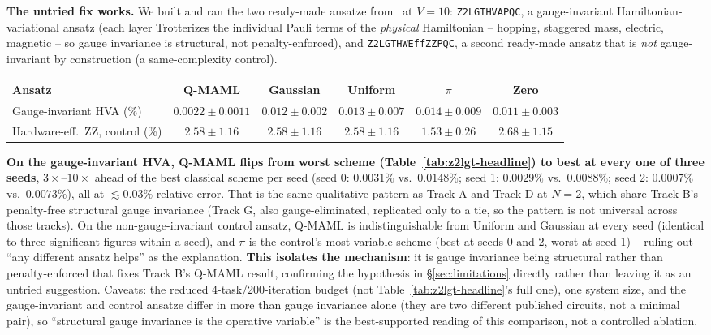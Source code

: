 \documentclass[11pt]{article}
\begin{document}
\begin{keyresult}
\textbf{The untried fix works.} We built and ran the two ready-made ansatze from~\citep{z2lgtbp2025} at
$V{=}10$: \texttt{Z2LGTHVAPQC}, a gauge-invariant Hamiltonian-variational ansatz (each layer Trotterizes
the individual Pauli terms of the \emph{physical} Hamiltonian -- hopping, staggered mass, electric,
magnetic -- so gauge invariance is structural, not penalty-enforced), and \texttt{Z2LGTHWEffZZPQC}, a
second ready-made ansatz that is \emph{not} gauge-invariant by construction (a same-complexity control).

\begin{center}
\label{tab:z2lgt-altansatz}
\begin{tabular}{lccccc}
\toprule
Ansatz & Q-MAML & Gaussian & Uniform & $\pi$ & Zero \\
\midrule
Gauge-invariant HVA (\%) & $\mathbf{0.0022}\pm0.0011$ & $0.012\pm0.002$ & $0.013\pm0.007$ &
$0.014\pm0.009$ & $0.011\pm0.003$ \\
Hardware-eff.\ ZZ, control (\%) & $2.58\pm1.16$ & $2.58\pm1.16$ & $2.58\pm1.16$ & $\mathbf{1.53}\pm0.26$ &
$2.68\pm1.15$ \\
\bottomrule
\end{tabular}
\end{center}

\textbf{On the gauge-invariant HVA, Q-MAML flips from worst scheme (Table~\ref{tab:z2lgt-headline}) to best
at every one of three seeds}, $3\times$--$10\times$ ahead of the best classical scheme per seed
(seed 0: $0.0031\%$ vs.\ $0.0148\%$; seed 1: $0.0029\%$ vs.\ $0.0088\%$; seed 2: $0.0007\%$ vs.\
$0.0073\%$), all at $\lesssim0.03\%$ relative error. That is the same qualitative pattern as Track A and
Track D at $N{=}2$, which share Track B's penalty-free structural gauge invariance (Track G, also
gauge-eliminated, replicated only to a tie, so the pattern is not universal across those tracks). On the
non-gauge-invariant control ansatz, Q-MAML is indistinguishable from Uniform and Gaussian at every seed
(identical to three significant figures within a seed), and $\pi$ is the control's most variable scheme
(best at seeds 0 and 2, worst at seed 1) -- ruling out ``any different ansatz helps'' as the explanation.
\textbf{This isolates the mechanism}: it is gauge invariance being structural rather than
penalty-enforced that fixes Track B's Q-MAML result, confirming the hypothesis in
\S\ref{sec:limitations} directly rather than leaving it as an untried suggestion. Caveats: the reduced
4-task/200-iteration budget (not Table~\ref{tab:z2lgt-headline}'s full one), one system size, and the
gauge-invariant and control ansatze differ in more than gauge invariance alone (they are two different
published circuits, not a minimal pair), so ``structural gauge invariance is the operative variable'' is
the best-supported reading of this comparison, not a controlled ablation.
\end{keyresult}
\end{document}
